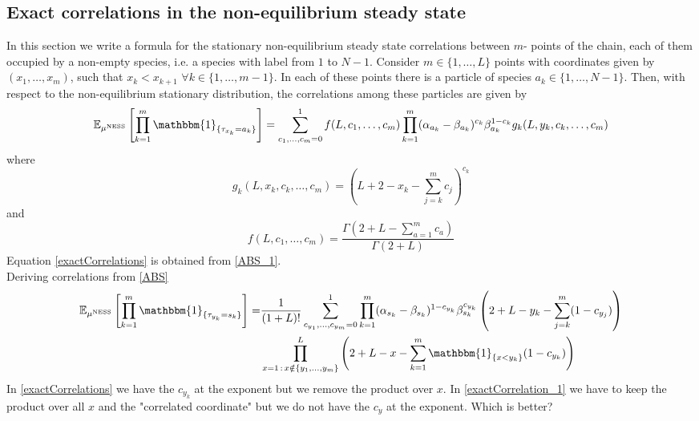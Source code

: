 \documentclass[10pt]{article}
\numberwithin{equation}{section}
\numberwithin{equation}{subsection}
\begin{document}
\subsection{Exact correlations in the non-equilibrium steady state}\label{subsection-exact}
In this section we write a formula for the stationary non-equilibrium steady state correlations between $m$- points of the chain, each of them occupied by a non-empty species, i.e. a species with label from $1$ to $N-1$. %
 Consider $m\in \{1,\ldots,L\}$ points with coordinates given by $(x_{1},\ldots,x_{m})$, such that $x_{k}<x_{k+1}$ $\forall k\in \{1,\ldots,m-1\}$. In each of these points there is a particle of species $a_{k}\in \{1,\ldots,N-1\}$. Then, with respect to the non-equilibrium stationary distribution, the correlations among these particles are given by
\begin{equation}\label{exactCorrelations}
	\mathbb{E}_{\mu^{\text{NESS}}}\left[\prod_{k=1}^{m}\mathbbm{1}_{\{\tau_{x_{k}}=a_{k}\}}\right]=\sum_{c_{1},\ldots,c_{m}=0}^{1}
	f(L,c_{1},\ldots,c_{m})\prod_{k=1}^{m}(\alpha_{a_{k}}-\beta_{a_{k}})^{c_{k}}\beta_{a_{k}}^{1-c_{k}}g_{k}(L,y_{k},c_{k},\ldots,c_{m})
\end{equation}
where 
\begin{equation}\label{powerCoeffSpecies}
	g_{k}(L,x_{k},c_{k},\ldots,c_{m})=\left(L+2-x_{k}-\sum_{j=k}^{m}c_{j}\right)^{c_{k}}
\end{equation}
and 
\begin{equation}\label{powerCoeffNOspec}
	f(L,c_{1},\ldots,c_{m})=\frac{\Gamma(2+L-\sum_{a=1}^{m}c_{a})}{\Gamma(2+L)}
\end{equation}
{\color{blue}
	Equation \eqref{exactCorrelations} is obtained from \eqref{ABS_1}.\\
	Deriving correlations from \eqref{ABS}
	\begin{equation}\label{exactCorrelation_1}
		\begin{split}
			\mathbb{E}_{\mu^{\text{NESS}}}\left[\prod_{k=1}^{m}\mathbbm{1}_{\{\tau_{y_{k}}=s_{k}\}}\right]=&\frac{1}{(1+L)!}\sum_{c_{y_{1}},\ldots,c_{y_{m}}=0}^{1}\prod_{k=1}^{m}(\alpha_{s_{k}}-\beta_{s_{k}})^{1-c_{y_{k}}}\beta_{s_{k}}^{c_{y_{k}}}\left(2+L-y_{k}-\sum_{j=k}^{m}(1-c_{y_{j}})\right)\\&\prod_{x=1\,:\,x\notin \{y_{1},\ldots,y_{m}\}}^{L}\left(2+L-x-\sum_{k=1}^{m}\mathbbm{1}_{\{x<y_{k}\}}(1-c_{y_{k}})\right)
		\end{split}
	\end{equation}
	In \eqref{exactCorrelations} we have the $c_{y_{k}}$ at the exponent but we remove the product over $x$.
	In \eqref{exactCorrelation_1} we have to keep the product over all $x$ and the "correlated coordinate" but we do not have the $c_{y}$ at the exponent. Which is better?
}
\end{document}
